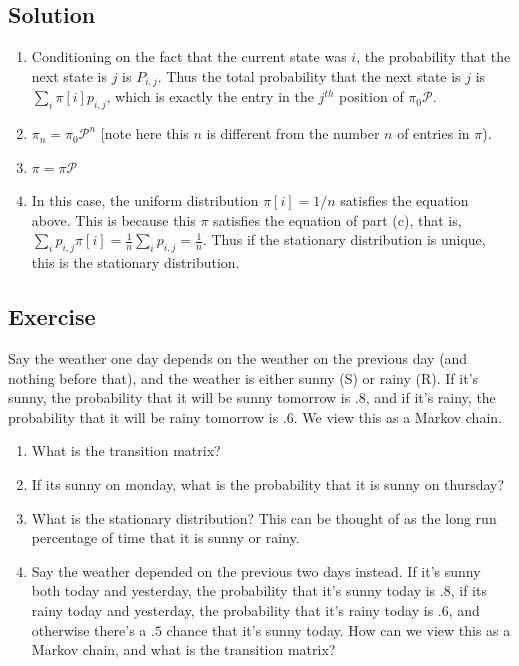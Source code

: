 \documentclass{article}
\newcounter{counter}
\newcommand{\Exercise}{Exercise \stepcounter{counter}\thecounter}
\begin{document}
\subsection*{Solution}
  \begin{enumerate}[label=(\alph*)]
    \item Conditioning on the fact that the current state was $i$, the
      probability that the next state is $j$ is $P_{i,j}$. Thus the total
      probability that the next state is $j$ is $\sum_i \pi[i] p_{i,j}$, which
      is exactly the entry in the $j^{th}$ position of $\pi_0 \mathcal{P}$. 
    \item $\pi_n = \pi_0 \mathcal{P}^n$ [note here this $n$ is different from the number $n$ of entries in $\pi$).
    \item $\pi = \pi \mathcal{P}$
    \item In this case, the uniform distribution $\pi[i] = 1/n$ satisfies the
      equation above. This is because this $\pi$ satisfies the equation of part (c), that is, $\sum_i p_{i,j}\pi[i] = \frac{1}{n}\sum_i p_{i,j} = \frac{1}{n}$.
      Thus if the stationary distribution is unique, this is the stationary
      distribution.
  \end{enumerate}

\subsection*{\Exercise}
  Say the weather one day depends on the weather on the previous day (and
  nothing before that), and the
  weather is either sunny (S) or rainy (R). If it's sunny, the probability
  that it will be sunny tomorrow is $.8$, and if it's rainy, the probability
  that it will be rainy tomorrow is $.6$. We view this as a Markov chain.
  \begin{enumerate}[label=(\alph*)]
    \item What is the transition matrix?
    \item If its sunny on monday, what is the probability that it is sunny
      on thursday?
    \item What is the stationary distribution? This can be thought of as the
      long run percentage of time that it is sunny or rainy.
    \item Say the weather depended on the previous two days instead. If it's
      sunny both today and yesterday, the probability that it's sunny today
      is $.8$, if its rainy today and yesterday, the probability that it's
      rainy today is $.6$, and otherwise there's a $.5$ chance that it's
      sunny today. How can we view this as a Markov chain, and what is the
      transition matrix?
  \end{enumerate}
\end{document}
